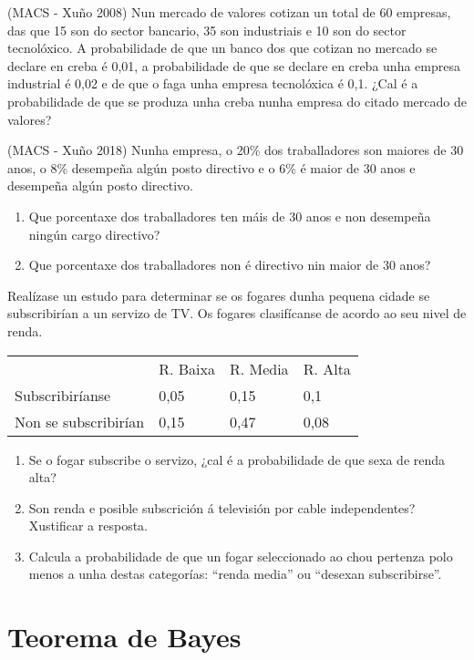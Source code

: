 \Exercicio  (MACS - Xuño 2008) Nun mercado de valores cotizan un total de 60 empresas, das que 15 son do sector bancario, 35 son industriais e 10 son do sector tecnolóxico. A probabilidade de que un banco dos que cotizan no mercado se declare en creba é 0,01, a probabilidade de que se declare en creba unha empresa industrial é 0,02 e de que o faga unha empresa tecnolóxica é 0,1. ¿Cal é a probabilidade de que se produza unha creba nunha empresa do citado mercado de valores?

\Exercicio (MACS - Xuño 2018) Nunha empresa, o 20\% dos traballadores son maiores de 30 anos, o 8\% desempeña algún posto directivo e o 6\% é maior de 30 anos e desempeña algún posto directivo.

\begin{enumerate}[topsep=0pt,itemsep=0pt]
	\item Que porcentaxe dos traballadores ten máis de 30 anos e non desempeña ningún cargo directivo?
	\item Que porcentaxe dos traballadores non é directivo nin maior de 30 anos?
\end{enumerate}


\Exercicio  Realízase un estudo para determinar se os fogares dunha pequena cidade se subscribirían a un servizo de TV. Os fogares clasifícanse de acordo ao seu nivel de renda.
\begin{center}
	\begin{tabular}{llll}
		& R. Baixa & R. Media & R. Alta \\
		Subscribiríanse      & 0,05        & 0,15        & 0,1        \\
		Non se subscribirían & 0,15        & 0,47        & 0,08      
	\end{tabular}
\end{center}

\begin{enumerate}[topsep=0pt,itemsep=0pt]
	\item Se o fogar subscribe o servizo, ¿cal é a probabilidade de que sexa de renda alta?
	\item Son renda e posible subscrición á televisión por cable independentes? Xustificar a resposta.
	\item Calcula a probabilidade de que un fogar seleccionado ao chou pertenza polo menos a unha destas categorías: “renda media” ou “desexan subscribirse”.
	
\end{enumerate}


\section{Teorema de Bayes}

